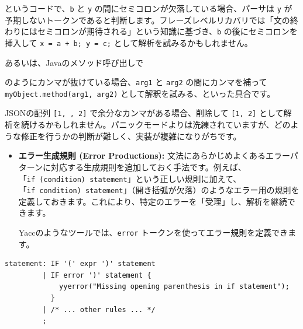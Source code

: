\begin{Shaded}
\begin{Highlighting}[]
\OperatorTok{=}\OperatorTok{+}\OperatorTok{=}\OperatorTok{;}
\end{Highlighting}
\end{Shaded}

というコードで、\texttt{b} と \texttt{y}
の間にセミコロンが欠落している場合、パーサは \texttt{y}
が予期しないトークンであると判断します。フレーズレベルリカバリでは「文の終わりにはセミコロンが期待される」という知識に基づき、\texttt{b}
の後にセミコロンを挿入して \texttt{x\ =\ a\ +\ b;\ y\ =\ c;}
として解析を試みるかもしれません。

あるいは、Javaのメソッド呼び出しで

\begin{Shaded}
\begin{Highlighting}[]
\end{Highlighting}
\end{Shaded}

のようにカンマが抜けている場合、\texttt{arg1} と \texttt{arg2}
の間にカンマを補って \texttt{myObject.method(arg1,\ arg2)}
として解釈を試みる、といった具合です。

JSONの配列 \texttt{{[}1,\ ,\ 2{]}} で余分なカンマがある場合、削除して
\texttt{{[}1,\ 2{]}}
として解析を続けるかもしれません。パニックモードよりは洗練されていますが、どのような修正を行うかの判断が難しく、実装が複雑になりがちです。

\begin{itemize}
\item
  \textbf{エラー生成規則 (Error Productions):}
  文法にあらかじめよくあるエラーパターンに対応する生成規則を追加しておく手法です。例えば、「\texttt{if\ (condition)\ statement}」という正しい規則に加えて、「\texttt{if\ condition)\ statement}」（開き括弧が欠落）のようなエラー用の規則を定義しておきます。これにより、特定のエラーを「受理」し、解析を継続できます。

  Yaccのようなツールでは、\texttt{error}
  トークンを使ってエラー規則を定義できます。
\end{itemize}

\begin{verbatim}
statement: IF '(' expr ')' statement
         | IF error ')' statement {
             yyerror("Missing opening parenthesis in if statement");
           }
         | /* ... other rules ... */
         ;
\end{verbatim}

